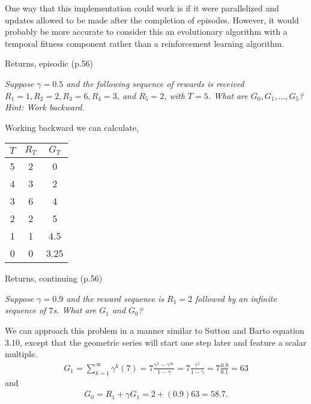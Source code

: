 \documentclass[12pt,letterpaper]{exam}
\begin{document}
\begin{questions}
\begin{solution}
		One way that this implementation could work is if it were parallelized and updates allowed to be made after the completion of episodes.
		However, it would probably be more accurate to consider this an evolutionary algorithm with a temporal fitness component 
		rather than a reinforcement learning algorithm.
	\end{solution}

	\clearpage

	\question%
	Returns, episodic (p.56)

	\emph{Suppose \(\gamma=0.5\) and the following sequence of rewards is received 
	\(R_1 = 1, R_2 = 2, R_3 = 6, R_4 = 3\), and \(R_5 = 2\), with \(T = 5\). What are \(G_0, G_1, \ldots, G_5\)? 
	Hint: Work backward.}
	\begin{solution}
		Working backward we can calculate,
		\begin{center}
			\begin{tabular}{ccc}
				\toprule
				$T$ & $R_T$ & $G_T$ \\
				\midrule
				5  & 2 & 0 \\
				4  & 3 & 2 \\
				3  & 6 & 4 \\
				2  & 2 & 5 \\
				1  & 1 & 4.5 \\
				0  & 0 & 3.25 \\
				\bottomrule
			\end{tabular}
		\end{center}
	\end{solution}

	\setcounter{question}{9-1}%
	\question%
	Returns, continuing (p.56)

	\emph{Suppose \(\gamma=0.9\) and the reward sequence is \(R_1 = 2\) followed by an infinite sequence of \(7\)s. 
	What are \(G_1\) and \(G_0\)?}
	\begin{solution}
		We can approach this problem in a manner similar to Sutton and Barto equation 3.10,
		except that the geometric series will start one step later and feature a scalar multiple.
		\begin{align*}
			G_1 = \sum_{k=1}^{\infty} \gamma^k (7)
			= 7\frac{\gamma^1-\gamma^\infty}{1-\gamma}
			= 7\frac{\gamma^1}{1-\gamma}
			= 7\frac{0.9}{0.1}
			= 63
		\end{align*}
		and
		\begin{align*}
			G_0 = R_1 + \gamma G_1
			= 2 + (0.9)63
			= 58.7 .
		\end{align*}
	\end{solution}


\end{questions}
\end{document}
